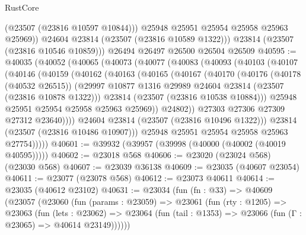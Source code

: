 \begin{lexlean}{RustCore}
\begin{coremodule}
              (@23507 (@23816 @10597 @10844)))
            @25948
            @25951
            @25954
            @25958
            @25963
            @25969))
        @24604
        @23814
        (@23507 (@23816 @10589 @1322)))
      @23814
      (@23507 (@23816 @10546 @10859)))
    @26494
    @26497
    @26500
    @26504
    @26509
@40595 := @40035
    (@40052
      (@40065
        (@40073
          (@40077
            (@40083
              (@40093
                (@40103
                  (@40107
                    (@40146
                      (@40159
                        (@40162
                          (@40163
                            (@40165
                              (@40167
                                (@40170
                                  (@40176
                                    (@40178 (@40532 @26515))
                                    (@29997
                                      @10877
                                      @1316
                                      @29989
                                      @24604
                                      @23814
                                      (@23507 (@23816 @10878 @1322)))
                                    @23814
                                    (@23507 (@23816 @10538 @10884)))
                                  @25948
                                  @25951
                                  @25954
                                  @25958
                                  @25963
                                  @25969))
                              @24802))
                          @27303
                          @27306
                          @27309
                          @27312
                          @23640))))
                  @24604
                  @23814
                  (@23507 (@23816 @10496 @1322)))
                @23814
                (@23507 (@23816 @10486 @10907)))
              @25948
              @25951
              @25954
              @25958
              @25963
              @27754)))))
@40601 := @39932 (@39957 (@39998 (@40000 (@40002 (@40019 @40595)))))
@40602 := @23018 @568
@40606 := @23020 (@23024 @568) (@23030 @568)
@40607 := @23039 @36138
@40609 := @23035 (@40607 @23054)
@40611 := @23077 (@23078 @568)
@40612 := @23073 @40611
@40614 := @23035 (@40612 @23102)
@40631 := @23034
    (fun (fn : @33) =>
    @40609
      (@23057
        (@23060
          (fun (params : @23059) =>
          @23061
            (fun (rty : @1205) =>
            @23063
              (fun (lets : @23062) =>
              @23064 (fun (tail : @1353) => @23066 (fun (Γ : @23065) => @40614 @23149))))))

\end{coremodule}
\end{lexlean}
